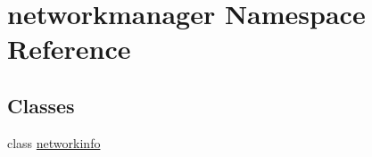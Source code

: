 \hypertarget{namespacenetworkmanager}{}\section{networkmanager Namespace Reference}
\label{namespacenetworkmanager}
\subsection*{Classes}
\begin{DoxyCompactItemize}
\item 
class \hyperlink{classnetworkmanager_1_1networkinfo}{networkinfo}
\end{DoxyCompactItemize}
